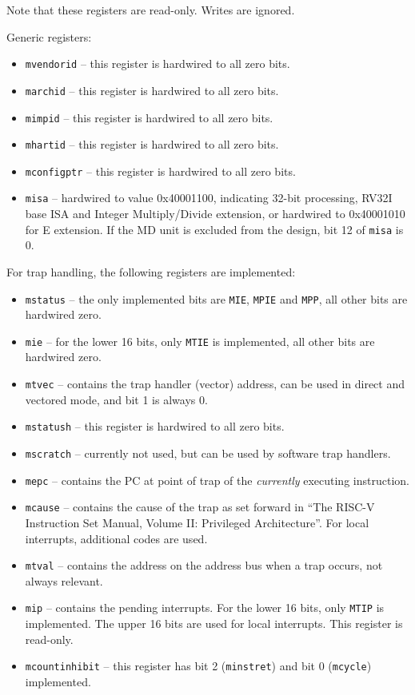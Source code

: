 \documentclass[12pt]{article}
\begin{document}
Note that these registers are read-only. Writes are ignored. 

Generic registers:

\begin{itemize}
\item \lstinline|mvendorid| -- this register is hardwired to all zero bits.
\item \lstinline|marchid| -- this register is hardwired to all zero bits.
\item \lstinline|mimpid| -- this register is hardwired to all zero bits.
\item \lstinline|mhartid| -- this register is hardwired to all zero bits.
\item \lstinline|mconfigptr| -- this register is hardwired to all zero bits.
\item \lstinline|misa| -- hardwired to value 0x40001100, indicating 32-bit processing, RV32I base ISA and Integer Multiply/Divide extension, or hardwired to 0x40001010 for E extension. If the MD unit is excluded from the design, bit 12 of \lstinline|misa| is 0.
\end{itemize}

For trap handling, the following registers are implemented:

\begin{itemize}
\item \lstinline|mstatus| -- the only implemented bits are \lstinline|MIE|, \lstinline|MPIE| and \lstinline|MPP|, all other bits are hardwired zero.
\item \lstinline|mie| -- for the lower 16 bits, only \lstinline|MTIE| is implemented, all other bits are hardwired zero.
\item \lstinline|mtvec| -- contains the trap handler (vector) address, can be used in direct and vectored mode, and bit 1 is always 0.
\item \lstinline|mstatush| -- this register is hardwired to all zero bits.
\item \lstinline|mscratch| -- currently not used, but can be used by software trap handlers.
\item \lstinline|mepc| -- contains the PC at point of trap of the \emph{currently} executing instruction.
\item \lstinline|mcause| -- contains the cause of the trap as set forward in ``The RISC-V Instruction Set Manual, Volume II: Privileged Architecture''. For local interrupts, additional codes are used.
\item \lstinline|mtval| -- contains the address on the address bus when a trap occurs, not always relevant.
\item \lstinline|mip| -- contains the pending interrupts. For the lower 16 bits, only \lstinline|MTIP| is implemented. The upper 16 bits are used for local interrupts. This register is read-only.
\item \lstinline|mcountinhibit| -- this register has bit 2 (\lstinline|minstret|) and bit 0 (\lstinline|mcycle|) implemented.
\end{itemize}
\end{document}

